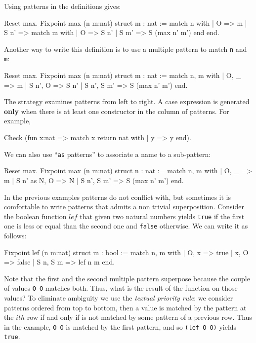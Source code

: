 Using patterns in the definitions gives:

\begin{coq_example}
Reset max.
Fixpoint max (n m:nat) {struct m} : nat :=
  match n with
  | O => m
  | S n' => match m with
            | O => S n'
            | S m' => S (max n' m')
            end
  end.
\end{coq_example}

Another way to write this definition is to use a multiple pattern to
 match    \verb+n+ and \verb+m+:

\begin{coq_example}
Reset max.
Fixpoint max (n m:nat) {struct m} : nat :=
  match n, m with
  | O, _ => m
  | S n', O => S n'
  | S n', S m' => S (max n' m')
  end.
\end{coq_example}


The strategy examines patterns 
from left to right. A case expression is generated {\bf only}  when there is at least one constructor in the column of patterns.
For example, 
\begin{coq_example}
Check (fun x:nat => match x return nat with
                    | y => y
                    end).
\end{coq_example}



We can also use ``\verb+as+ patterns'' to associate a name to a
sub-pattern:

\begin{coq_example}
Reset max.
Fixpoint max (n m:nat) {struct n} : nat :=
  match n, m with
  | O, _ => m
  | S n' as N, O => N
  | S n', S m' => S (max n' m')
  end.
\end{coq_example}


In the previous examples patterns do not conflict with, but
sometimes it is comfortable to write patterns that admits a non
trivial superposition. Consider
the boolean function $lef$ that given two natural numbers
yields \verb+true+ if the first one is less or equal than the second
one and \verb+false+ otherwise. We can write it as follows:

\begin{coq_example}
Fixpoint lef (n m:nat) {struct m} : bool :=
  match n, m with
  | O, x => true
  | x, O => false
  | S n, S m => lef n m
  end.
\end{coq_example}

Note that the first and the second  multiple pattern  superpose because the couple of
values \verb+O O+ matches both. Thus, what is the result of the
function on those values?
To eliminate ambiguity we use the {\em textual priority rule}: we
consider patterns ordered from top to bottom, then a value is matched
by the  pattern at the $ith$ row if and only if is not matched by some
pattern of a previous row. Thus in the example,
\verb+O O+ is matched by the first pattern, and so \verb+(lef O O)+
yields \verb+true+.

